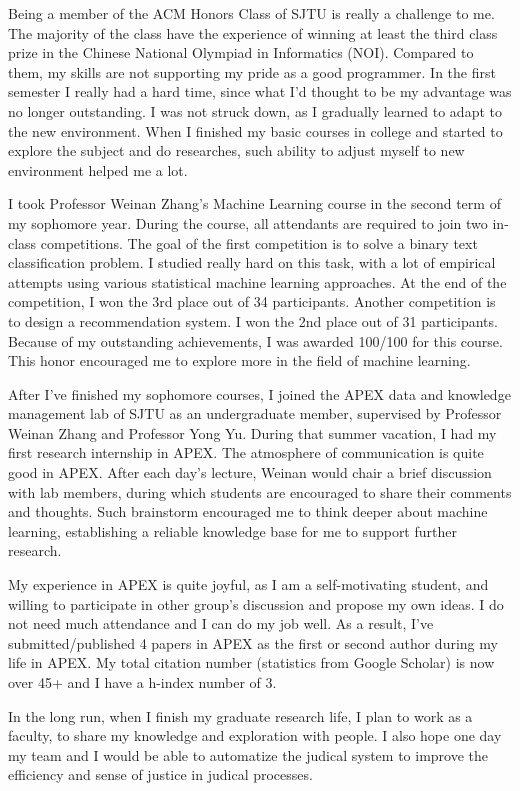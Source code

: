 \documentclass{article}
\begin{document}
      Being a member of the ACM Honors Class of SJTU is really a challenge to me. The majority of the class have the experience of winning at least the third class prize in the Chinese National Olympiad in Informatics (NOI). Compared to them, my skills are not supporting my pride as a good programmer. In the first semester I really had a hard time, since what I'd thought to be my advantage was no longer outstanding. I was not struck down, as I gradually learned to adapt to the new environment. When I finished my basic courses in college and started to explore the subject and do researches, such ability to adjust myself to new environment helped me a lot.
      
      I took Professor Weinan Zhang's Machine Learning course in the second term of my sophomore year. During the course, all attendants are required to join two in-class competitions. The goal of the first competition is to solve a binary text classification problem. I studied really hard on this task, with a lot of empirical attempts using various statistical machine learning approaches. At the end of the competition, I won the 3rd place out of 34 participants. Another competition is to design a recommendation system. I won the 2nd place out of 31 participants. Because of my outstanding achievements, I was awarded 100/100 for this course. This honor encouraged me to explore more in the field of machine learning.

      After I've finished my sophomore courses, I joined the APEX data and knowledge management lab of SJTU as an undergraduate member, supervised by Professor Weinan Zhang and Professor Yong Yu. During that summer vacation, I had my first research internship in APEX. The atmosphere of communication is quite good in APEX. After each day's lecture, Weinan would chair a brief discussion with lab members, during which students are encouraged to share their comments and thoughts. Such brainstorm encouraged me to think deeper about machine learning, establishing a reliable knowledge base for me to support further research. 

      My experience in APEX is quite joyful, as I am a self-motivating student, and willing to participate in other group's discussion and propose my own ideas. I do not need much attendance and I can do my job well. As a result, I've submitted/published 4 papers in APEX as the first or second author during my life in APEX. My total citation number (statistics from Google Scholar) is now over 45+ and I have a h-index number of 3.

      In the long run, when I finish my graduate research life, I plan to work as a faculty, to share my knowledge and exploration with people. I also hope one day my team and I would be able to automatize the judical system to improve the efficiency and sense of justice in judical processes.
      


    
\end{document}
